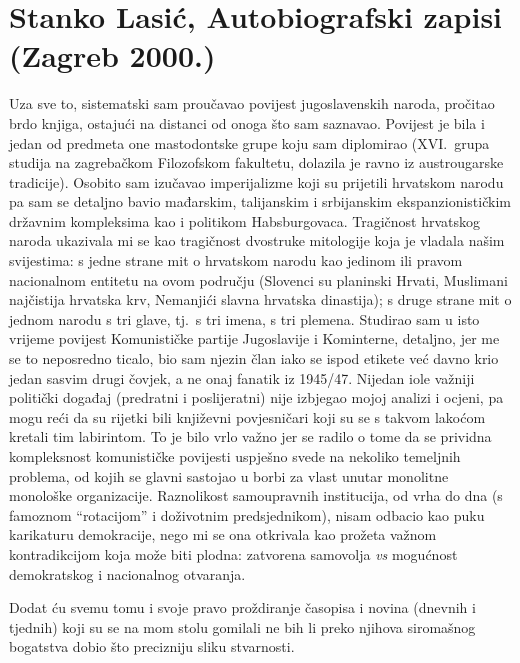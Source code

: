 \documentclass[a4paper,12pt,twoside]{report}
\begin{document}
\chapter[Stanko Lasić, Autobiografski zapisi]{Stanko Lasić, Autobiografski zapisi (Zagreb 2000.)}

Uza sve to, sistematski sam proučavao povijest jugoslavenskih naroda, pročitao brdo knjiga, ostajući na distanci od onoga što sam saznavao. Povijest je bila i jedan od predmeta one mastodontske grupe koju sam diplomirao (XVI.\ grupa studija na zagrebačkom Filozofskom fakultetu, dolazila je ravno iz austrougarske tradicije). Osobito sam izučavao imperijalizme koji su prijetili hrvatskom narodu pa sam se detaljno bavio mađarskim, talijanskim i srbijanskim ekspanzionističkim državnim kompleksima kao i politikom Habsburgovaca. Tragičnost hrvatskog naroda ukazivala mi se kao tragičnost dvostruke mitologije koja je vladala našim svijestima: s jedne strane mit o hrvatskom narodu kao jedinom ili pravom nacionalnom entitetu na ovom području (Slovenci su planinski Hrvati, Muslimani najčistija hrvatska krv, Nemanjići slavna hrvatska dinastija); s druge strane mit o jednom narodu s tri glave, tj.\ s tri imena, s tri plemena. Studirao sam u isto vrijeme povijest Komunističke partije Jugoslavije i Kominterne, detaljno, jer me se to neposredno ticalo, bio sam njezin član iako se ispod etikete već davno krio jedan sasvim drugi čovjek, a ne onaj fanatik iz 1945/47. Nijedan iole važniji politički događaj (predratni i poslijeratni) nije izbjegao mojoj analizi i ocjeni, pa mogu reći da su rijetki bili književni povjesničari koji su se s takvom lakoćom kretali tim labirintom. To je bilo vrlo važno jer se radilo o tome da se prividna kompleksnost komunističke povijesti uspješno svede na nekoliko temeljnih problema, od kojih se glavni sastojao u borbi za vlast unutar monolitne monološke organizacije. Raznolikost samoupravnih institucija, od vrha do dna (s famoznom ``rotacijom'' i doživotnim predsjednikom), nisam odbacio kao puku karikaturu demokracije, nego mi se ona otkrivala kao prožeta važnom kontradikcijom koja može biti plodna: zatvorena samovolja \textit{vs} mogućnost demokratskog i nacionalnog otvaranja.

Dodat ću svemu tomu i svoje pravo proždiranje časopisa i novina (dnevnih i tjednih) koji su se na mom stolu gomilali ne bih li preko njihova siromašnog bogatstva dobio što precizniju sliku stvarnosti.
\end{document}
